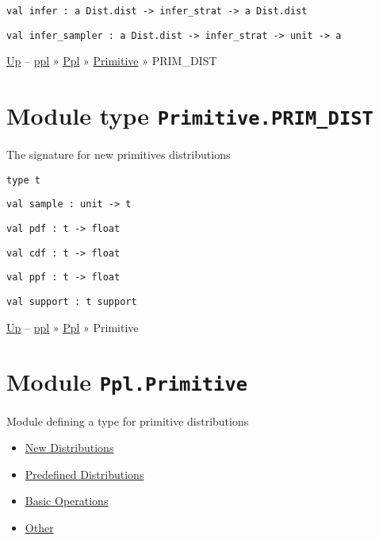 \protect\hyperlink{val-infer}{}\texttt{val\ infer\ :\ \textquotesingle{}a\ Dist.dist\ -\textgreater{}\ infer\_strat\ -\textgreater{}\ \textquotesingle{}a\ Dist.dist}

\protect\hyperlink{val-inferux5fsampler}{}\texttt{val\ infer\_sampler\ :\ \textquotesingle{}a\ Dist.dist\ -\textgreater{}\ infer\_strat\ -\textgreater{}\ unit\ -\textgreater{}\ \textquotesingle{}a}

\href{../index.html}{Up} -- \href{../../../index.html}{ppl} »
\href{../../index.html}{Ppl} » \href{../index.html}{Primitive} »
PRIM\_DIST

\section{\texorpdfstring{Module type
\texttt{Primitive.PRIM\_DIST}}{Module type Primitive.PRIM\_DIST}}\label{module-type-primitive.primux5fdist}

The signature for new primitives distributions

\protect\hyperlink{type-t}{}\texttt{type\ t}

\protect\hyperlink{val-sample}{}\texttt{val\ sample\ :\ unit\ -\textgreater{}\ t}

\protect\hyperlink{val-pdf}{}\texttt{val\ pdf\ :\ t\ -\textgreater{}\ float}

\protect\hyperlink{val-cdf}{}\texttt{val\ cdf\ :\ t\ -\textgreater{}\ float}

\protect\hyperlink{val-ppf}{}\texttt{val\ ppf\ :\ t\ -\textgreater{}\ float}

\protect\hyperlink{val-support}{}\texttt{val\ support\ :\ t\ support}

\href{../index.html}{Up} -- \href{../../index.html}{ppl} »
\href{../index.html}{Ppl} » Primitive

\section{\texorpdfstring{Module
\texttt{Ppl.Primitive}}{Module Ppl.Primitive}}\label{module-ppl.primitive}

Module defining a type for primitive distributions

\begin{itemize}
\tightlist
\item
  \protect\hyperlink{newux5fprim}{New Distributions}
\item
  \protect\hyperlink{inbuiltux5fdists}{Predefined Distributions}
\item
  \protect\hyperlink{basicux5fops}{Basic Operations}
\item
  \protect\hyperlink{primux5fother}{Other}
\end{itemize}


